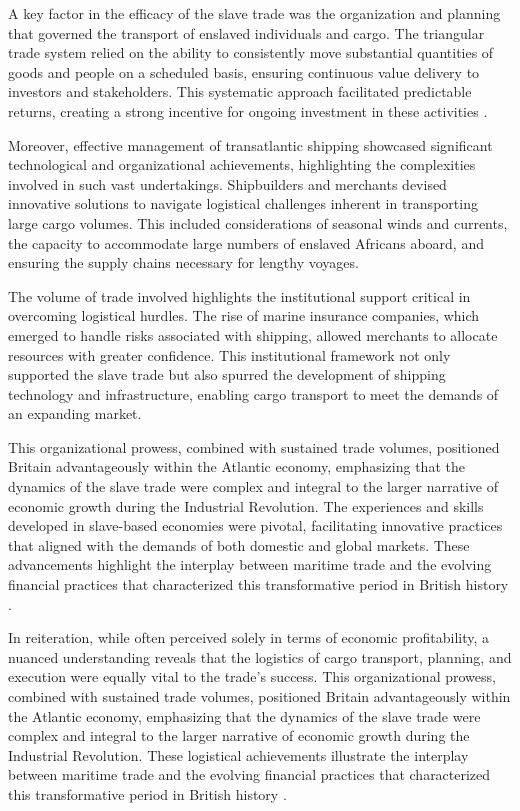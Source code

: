 \documentclass[a4paper,11pt]{article}
\begin{document}
A key factor in the efficacy of the slave trade was the organization and planning that governed the transport of enslaved individuals and cargo. The triangular trade system relied on the ability to consistently move substantial quantities of goods and people on a scheduled basis, ensuring continuous value delivery to investors and stakeholders. This systematic approach facilitated predictable returns, creating a strong incentive for ongoing investment in these activities \citep{harley2015}.

Moreover, effective management of transatlantic shipping showcased significant technological and organizational achievements, highlighting the complexities involved in such vast undertakings. Shipbuilders and merchants devised innovative solutions to navigate logistical challenges inherent in transporting large cargo volumes. This included considerations of seasonal winds and currents, the capacity to accommodate large numbers of enslaved Africans aboard, and ensuring the supply chains necessary for lengthy voyages.

The volume of trade involved highlights the institutional support critical in overcoming logistical hurdles. The rise of marine insurance companies, which emerged to handle risks associated with shipping, allowed merchants to allocate resources with greater confidence. This institutional framework not only supported the slave trade but also spurred the development of shipping technology and infrastructure, enabling cargo transport to meet the demands of an expanding market.

This organizational prowess, combined with sustained trade volumes, positioned Britain advantageously within the Atlantic economy, emphasizing that the dynamics of the slave trade were complex and integral to the larger narrative of economic growth during the Industrial Revolution. The experiences and skills developed in slave-based economies were pivotal, facilitating innovative practices that aligned with the demands of both domestic and global markets. These advancements highlight the interplay between maritime trade and the evolving financial practices that characterized this transformative period in British history \citep{berghudson2021}.

In reiteration, while often perceived solely in terms of economic profitability, a nuanced understanding reveals that the logistics of cargo transport, planning, and execution were equally vital to the trade's success. This organizational prowess, combined with sustained trade volumes, positioned Britain advantageously within the Atlantic economy, emphasizing that the dynamics of the slave trade were complex and integral to the larger narrative of economic growth during the Industrial Revolution. These logistical achievements illustrate the interplay between maritime trade and the evolving financial practices that characterized this transformative period in British history \citep{harley2015}.
\end{document}
